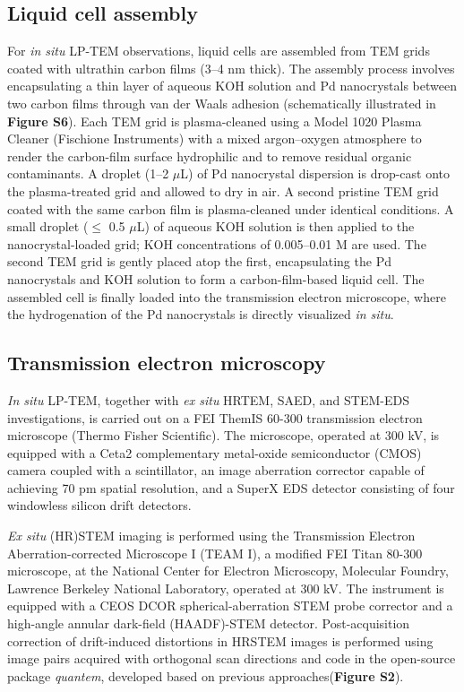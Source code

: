 \documentclass[reprint,amsmath,amssymb,aip,nofootinbib, citeautoscript,]{revtex4-2}
\begin{document}
\subsection*{Liquid cell assembly}

For \textit{in situ} LP-TEM observations, liquid cells are assembled from TEM grids coated with ultrathin carbon films (3–4 nm thick). The assembly process involves encapsulating a thin layer of aqueous KOH solution and Pd nanocrystals between two carbon films through van der Waals adhesion (schematically illustrated in \textbf{Figure S6}). Each TEM grid is plasma-cleaned using a Model 1020 Plasma Cleaner (Fischione Instruments) with a mixed argon–oxygen atmosphere to render the carbon-film surface hydrophilic and to remove residual organic contaminants. A droplet (1–2 $\mu$L) of Pd nanocrystal dispersion is drop-cast onto the plasma-treated grid and allowed to dry in air. A second pristine TEM grid coated with the same carbon film is plasma-cleaned under identical conditions. A small droplet ($\leq$ 0.5 $\mu$L) of aqueous KOH solution is then applied to the nanocrystal-loaded grid; KOH concentrations of 0.005–0.01 M are used. The second TEM grid is gently placed atop the first, encapsulating the Pd nanocrystals and KOH solution to form a carbon-film-based liquid cell. The assembled cell is finally loaded into the transmission electron microscope, where the hydrogenation of the Pd nanocrystals is directly visualized \textit{in situ}.


\subsection*{Transmission electron microscopy}

\textit{In situ} LP-TEM, together with \textit{ex situ} HRTEM, SAED, and STEM-EDS investigations, is carried out on a FEI ThemIS 60-300 transmission electron microscope (Thermo Fisher Scientific). The microscope, operated at 300 kV, is equipped with a Ceta2 complementary metal-oxide semiconductor (CMOS) camera coupled with a scintillator, an image aberration corrector capable of achieving 70 pm spatial resolution, and a SuperX EDS detector consisting of four windowless silicon drift detectors.


\textit{Ex situ} (HR)STEM imaging is performed using the Transmission Electron Aberration-corrected Microscope I (TEAM I), a modified FEI Titan 80-300 microscope, at the National Center for Electron Microscopy, Molecular Foundry, Lawrence Berkeley National Laboratory, operated at 300 kV. The instrument is equipped with a CEOS DCOR spherical-aberration STEM probe corrector and a high-angle annular dark-field (HAADF)-STEM detector. Post-acquisition correction of drift-induced distortions in HRSTEM images is performed using image pairs acquired with orthogonal scan directions and code in the open-source package \textit{quantem}, developed based on previous approaches\cite{ophus_correcting_2016}(\textbf{Figure S2}).
\end{document}

